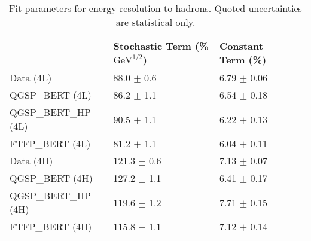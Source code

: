 \begin{table}[!htb]
\begin{center}
\begin{tabular}{|l|l|l|l|}
\hline
& Stochastic Term (\% $\mathrm{GeV}^{1/2}$) & Constant Term (\%) \\
\hline
Data (4L) & 88.0 $\pm$ 0.6 & 6.79 $\pm$ 0.06\\
QGSP\_BERT (4L) & 86.2 $\pm$ 1.1 & 6.54 $\pm$ 0.18\\
QGSP\_BERT\_HP (4L) & 90.5 $\pm$ 1.1 & 6.22 $\pm$ 0.13\\
FTFP\_BERT (4L) & 81.2 $\pm$ 1.1 & 6.04 $\pm$ 0.11\\
Data (4H) & 121.3 $\pm$ 0.6 & 7.13 $\pm$ 0.07\\
QGSP\_BERT (4H) & 127.2 $\pm$ 1.1 & 6.41 $\pm$ 0.17\\
QGSP\_BERT\_HP (4H) & 119.6 $\pm$ 1.2 & 7.71 $\pm$ 0.15\\
FTFP\_BERT (4H) & 115.8 $\pm$ 1.1 & 7.12 $\pm$ 0.14\\
\hline
\end{tabular}
\end{center}
\caption{Fit parameters for energy resolution to hadrons. Quoted uncertainties are statistical only.}
\label{table_resolution_hadrons}
\end{table}

